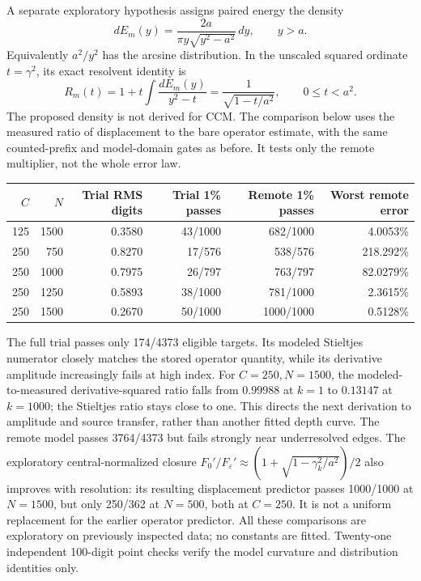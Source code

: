 A separate exploratory hypothesis assigns paired energy the density
\[
 dE_m(y)=\frac{2a}{\pi y\sqrt{y^2-a^2}}\,dy,\qquad y>a.
\]
Equivalently $a^2/y^2$ has the arcsine distribution. In the unscaled
squared ordinate $t=\gamma^2$, its exact resolvent identity is
\[
 R_m(t)=1+t\int\frac{dE_m(y)}{y^2-t}
       =\frac1{\sqrt{1-t/a^2}},\qquad 0\leq t<a^2.
\]
The proposed density is not derived for CCM. The comparison below uses
the measured ratio of displacement to the bare operator estimate,
with the same counted-prefix and model-domain gates as before.
It tests only the remote multiplier, not the whole error law.
\begin{center}\small
\begin{tabular}{rr|rr|rr}
\toprule
$C$&$N$&Trial RMS digits&Trial 1\% passes&Remote 1\% passes&Worst remote error\\
\midrule
125&1500&0.3580&43/1000&682/1000&4.0053\%\\
250&750 &0.8270&17/576 &538/576 &218.292\%\\
250&1000&0.7975&26/797 &763/797 &82.0279\%\\
250&1250&0.5893&38/1000&781/1000&2.3615\%\\
250&1500&0.2670&50/1000&1000/1000&0.5128\%\\
\bottomrule
\end{tabular}
\end{center}
The full trial passes only 174/4373 eligible targets. Its modeled
Stieltjes numerator closely matches the stored operator quantity, while
its derivative amplitude increasingly fails at high index. For
$C=250,N=1500$, the modeled-to-measured derivative-squared ratio falls
from $0.99988$ at $k=1$ to $0.13147$ at $k=1000$; the Stieltjes ratio
stays close to one. This directs the next derivation to amplitude and
source transfer, rather than another fitted depth curve. The remote
model passes 3764/4373 but fails strongly near underresolved edges.
The exploratory central-normalized closure
$F_0'/F_\varepsilon'\approx(1+\sqrt{1-\gamma_k^2/a^2})/2$
also improves with resolution: its resulting displacement predictor
passes 1000/1000 at $N=1500$, but only 250/362 at $N=500$, both at
$C=250$. It is not a uniform replacement for the earlier operator
predictor. All these comparisons are exploratory on previously inspected
data; no constants are fitted. Twenty-one independent 100-digit point
checks verify the model curvature and distribution identities only.


